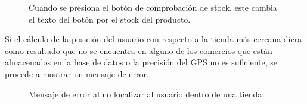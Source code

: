 \begin{figure}[H]
	\centering
	\caption{Cuando se presiona el botón de comprobación de stock, este cambia el texto del botón por el stock del producto.}
	\label{fig:botonStock}
\end{figure}

Si el cálculo de la posición del usuario con respecto a la tienda más cercana diera como resultado que no se encuentra en alguno de los comercios que están almacenados en la base de datos o la precisión del GPS no es suficiente, se procede a mostrar un mensaje de error.

\begin{figure}[H]
	\centering
	\caption{Mensaje de error al no localizar al usuario dentro de una tienda.}
	\label{fig:errorGPS}
\end{figure}

